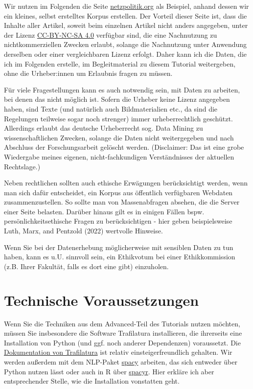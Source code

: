 \documentclass[
  letterpaper,
  DIV=11,
  numbers=noendperiod]{scrreprt}
\begin{document}
Wir nutzen im Folgenden die Seite
\href{https://netzpolitik.org}{netzpolitik.org} als Beispiel, anhand
dessen wir ein kleines, selbst erstelltes Korpus erstellen. Der Vorteil
dieser Seite ist, dass die Inhalte aller Artikel, soweit beim einzelnen
Artikel nicht anders angegeben, unter der Lizenz
\href{https://creativecommons.org/licenses/by-nc-sa/4.0/}{CC-BY-NC-SA
4.0} verfügbar sind, die eine Nachnutzung zu nichtkommerziellen Zwecken
erlaubt, solange die Nachnutzung unter Anwendung derselben oder einer
vergleichbaren Lizenz erfolgt. Daher kann ich die Daten, die ich im
Folgenden erstelle, im Begleitmaterial zu diesem Tutorial weitergeben,
ohne die Urheber:innen um Erlaubnis fragen zu müssen.

Für viele Fragestellungen kann es auch notwendig sein, mit Daten zu
arbeiten, bei denen das nicht möglich ist. Sofern die Urheber keine
Lizenz angegeben haben, sind Texte (und natürlich auch Bildmaterialien
etc., da sind die Regelungen teilweise sogar noch strenger) immer
urheberrechtlich geschützt. Allerdings erlaubt das deutsche Urheberrecht
sog. Data Mining zu wissenschaftlichen Zwecken, solange die Daten nicht
weitergegeben und nach Abschluss der Forschungsarbeit gelöscht werden.
(Disclaimer: Das ist eine grobe Wiedergabe meines eigenen,
nicht-fachkundigen Verständnisses der aktuellen Rechtslage.)

Neben rechtlichen sollten auch ethische Erwägungen berücksichtigt
werden, wenn man sich dafür entscheidet, ein Korpus aus öffentlich
verfügbaren Webdaten zusammenzustellen. So sollte man von Massenabfragen
absehen, die die Server einer Seite belasten. Darüber hinaus gilt es in
einigen Fällen bspw. persönlichkeitsethische Fragen zu berücksichtigen -
hier geben beispielsweise Luth, Marx, and Pentzold (2022) wertvolle
Hinweise.

Wenn Sie bei der Datenerhebung möglicherweise mit sensiblen Daten zu tun
haben, kann es u.U. sinnvoll sein, ein Ethikvotum bei einer
Ethikkommission (z.B. Ihrer Fakultät, falls es dort eine gibt)
einzuholen.


\chapter{Technische Voraussetzungen}\label{technik}

Wenn Sie die Techniken aus dem Advanced-Teil des Tutorials nutzen
möchten, müssen Sie insbesondere die Software Trafilatura installieren,
die ihrerseits eine Installation von Python (und ggf. noch anderer
Dependenzen) voraussetzt. Die
\href{https://trafilatura.readthedocs.io/en/latest/installation.html}{Dokumentation
von Trafilatura} ist relativ einsteigerfreundlich gehalten. Wir werden
außerdem mit dem NLP-Paket \href{https://spacy.io/}{spacy} arbeiten, das
sich entweder über Python nutzen lässt oder auch in R über
\href{https://spacyr.quanteda.io/}{spacyr}. Hier erkläre ich aber
entsprechender Stelle, wie die Installation vonstatten geht.
\end{document}
